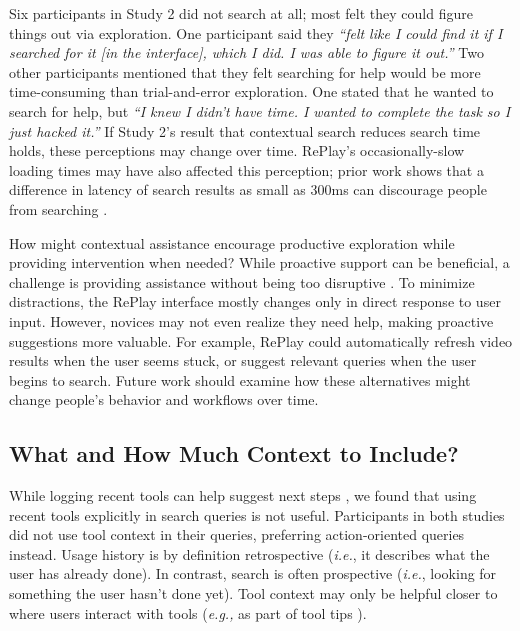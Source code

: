 Six participants in Study 2 did not search at all; most felt they could figure things out via exploration. One participant said they \textit{``felt like I could find it if I searched for it [in the interface], which I did. I was able to figure it out.''} Two other participants mentioned that they felt searching for help would be more time-consuming than trial-and-error exploration. One stated that he wanted to search for help, but \textit{``I knew I didn't have time. I wanted to complete the task so I just hacked it.''} If Study 2's result that contextual search reduces search time holds, these perceptions may change over time. RePlay's occasionally-slow loading times may have also affected this perception; prior work shows that a difference in latency of search results as small as 300ms can discourage people from searching \cite{Brutlag2009}.

How might contextual assistance encourage productive exploration while providing intervention when needed? While proactive support can be beneficial, a challenge is providing assistance without being too disruptive \cite{Matejka2011}. To minimize distractions, the RePlay interface mostly changes only in direct response to user input. However, novices may not even realize they need help, making proactive suggestions more valuable. For example, RePlay could automatically refresh video results when the user seems stuck, or suggest relevant queries when the user begins to search. Future work should examine how these alternatives might change people's behavior and workflows over time.

\subsection{What and How Much Context to Include?}
While logging recent tools can help suggest next steps \cite{Matejka2009}, we found that using recent tools explicitly in search queries is not useful. Participants in both studies did not use tool context in their queries, preferring action-oriented queries instead. Usage history is by definition retrospective (\textit{i.e.}, it describes what the user has already done). In contrast, search is often prospective (\textit{i.e.}, looking for something the user hasn't done yet). Tool context may only be helpful closer to where users interact with tools (\textit{e.g.,} as part of tool tips \cite{Grossman2010a}).

